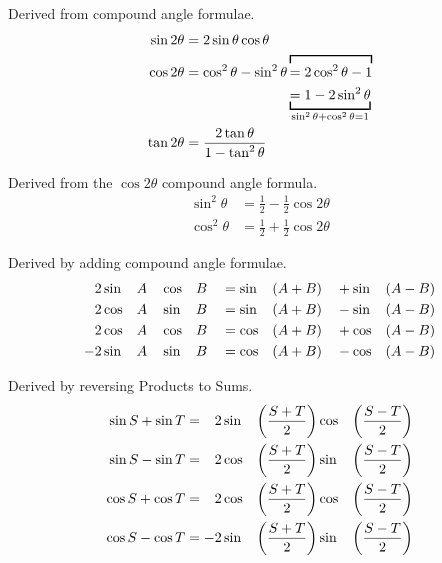 \begin{multicols}{2}
{        Derived from compound angle formulae.
        \begin{align*}
            \sin{2 \theta} &= 2 \sin{\theta} \cos{\theta} \\
            \cos{2 \theta} &= \cos^2{\theta} - \sin^2{\theta}  \overbracket[1pt][1.75mm]{= 2 \cos^2{\theta} - 1} \\
                &\phantom{{}= \cos^2{\theta} - \sin^2{\theta}} \underbracket[1pt][1.75mm]{= 1 - 2 \sin^2{\theta}}_{
                        \sin^2{\theta} + \cos^2{\theta} = 1
                }\\
            \tan{2 \theta} &= \frac{2 \tan{\theta}}{1 - \tan^2{\theta}}
        \end{align*}


        Derived from the $\cos{2 \theta}$ compound angle formula.
        \begin{align*}
            \sin^2{\theta} &= \frac{1}{2} - \frac{1}{2} \cos{2 \theta} \\
            \cos^2{\theta} &= \frac{1}{2} + \frac{1}{2} \cos{2 \theta}
        \end{align*}


        Derived by adding compound angle formulae.
        \begin{alignat*}{8}
             &2 \sin&&{A} && \cos&&{B} &&= \sin&&{\parens*{A+B}} &&+ \sin&&{\parens*{A-B}} \\
             &2 \cos&&{A} && \sin&&{B} &&= \sin&&{\parens*{A+B}} &&- \sin&&{\parens*{A-B}} \\
             &2 \cos&&{A} && \cos&&{B} &&= \cos&&{\parens*{A+B}} &&+ \cos&&{\parens*{A-B}} \\
            -&2 \sin&&{A} && \sin&&{B} &&= \cos&&{\parens*{A+B}} &&- \cos&&{\parens*{A-B}}
        \end{alignat*}


        Derived by reversing Products to Sums.
        \begin{alignat*}{3}
            \sin{S} + \sin{T} &= \phantom{+} 2 \sin&&{\parens*{\frac{S+T}{2}}} \cos&&{\parens*{\frac{S-T}{2}}} \\
            \sin{S} - \sin{T} &= \phantom{+} 2 \cos&&{\parens*{\frac{S+T}{2}}} \sin&&{\parens*{\frac{S-T}{2}}} \\
            \cos{S} + \cos{T} &= \phantom{+} 2 \cos&&{\parens*{\frac{S+T}{2}}} \cos&&{\parens*{\frac{S-T}{2}}} \\
            \cos{S} - \cos{T} &=          -  2 \sin&&{\parens*{\frac{S+T}{2}}} \sin&&{\parens*{\frac{S-T}{2}}}
        \end{alignat*}

}
\end{multicols}
